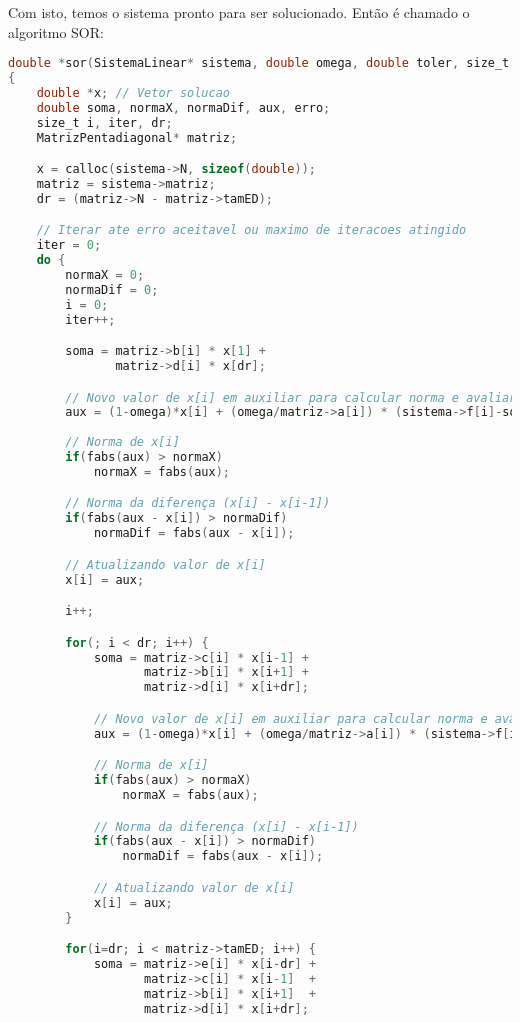 \documentclass[
	11pt,				%
	oneside,			%
	a4paper,			%
	english,			%
	brazil,				%
	]{article}
\begin{document}
Com isto, temos o sistema pronto para ser solucionado. Então é chamado o 
algoritmo SOR:
\begin{lstlisting}[language=C, caption=Função SOR normal]
double *sor(SistemaLinear* sistema, double omega, double toler, size_t iterMax)
{
	double *x; // Vetor solucao
	double soma, normaX, normaDif, aux, erro;
	size_t i, iter, dr;
    MatrizPentadiagonal* matriz;

	x = calloc(sistema->N, sizeof(double));
    matriz = sistema->matriz;
    dr = (matriz->N - matriz->tamED);

    // Iterar ate erro aceitavel ou maximo de iteracoes atingido
	iter = 0;
	do {
        normaX = 0;
        normaDif = 0;
        i = 0;
		iter++;

        soma = matriz->b[i] * x[1] +
               matriz->d[i] * x[dr];

        // Novo valor de x[i] em auxiliar para calcular norma e avaliar erro
        aux = (1-omega)*x[i] + (omega/matriz->a[i]) * (sistema->f[i]-soma);
        
        // Norma de x[i]
        if(fabs(aux) > normaX)
            normaX = fabs(aux);

        // Norma da diferença (x[i] - x[i-1])
        if(fabs(aux - x[i]) > normaDif)
            normaDif = fabs(aux - x[i]);

        // Atualizando valor de x[i]
        x[i] = aux;

        i++;

        for(; i < dr; i++) {
            soma = matriz->c[i] * x[i-1] +
                   matriz->b[i] * x[i+1] +
                   matriz->d[i] * x[i+dr];

            // Novo valor de x[i] em auxiliar para calcular norma e avaliar erro
            aux = (1-omega)*x[i] + (omega/matriz->a[i]) * (sistema->f[i]-soma);

            // Norma de x[i]
            if(fabs(aux) > normaX)
                normaX = fabs(aux);

            // Norma da diferença (x[i] - x[i-1])
            if(fabs(aux - x[i]) > normaDif)
                normaDif = fabs(aux - x[i]);

            // Atualizando valor de x[i]
            x[i] = aux;
        }

        for(i=dr; i < matriz->tamED; i++) {
            soma = matriz->e[i] * x[i-dr] +
                   matriz->c[i] * x[i-1]  +
                   matriz->b[i] * x[i+1]  +
                   matriz->d[i] * x[i+dr];


\end{lstlisting}
\end{document}
